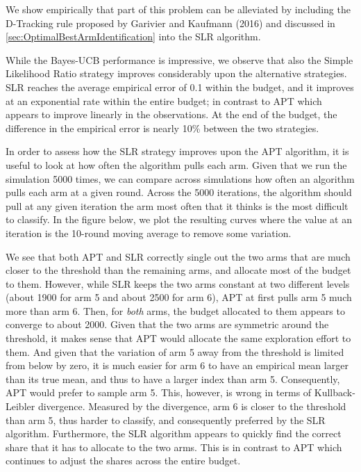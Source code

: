 \documentclass[11pt,]{article}
\begin{document}
We show empirically that part of this problem can be alleviated by
including the D-Tracking rule proposed by Garivier and Kaufmann (2016)
and discussed in \autoref{sec:OptimalBestArmIdentification} into the SLR
algorithm.

While the Bayes-UCB performance is impressive, we observe that also the
Simple Likelihood Ratio strategy improves considerably upon the
alternative strategies. SLR reaches the average empirical error of 0.1
within the budget, and it improves at an exponential rate within the
entire budget; in contrast to APT which appears to improve linearly in
the observations. At the end of the budget, the difference in the
empirical error is nearly 10\% between the two strategies.

In order to assess how the SLR strategy improves upon the APT algorithm,
it is useful to look at how often the algorithm pulls each arm. Given
that we run the simulation 5000 times, we can compare across simulations
how often an algorithm pulls each arm at a given round. Across the 5000
iterations, the algorithm should pull at any given iteration the arm
most often that it thinks is the most difficult to classify. In the
figure below, we plot the resulting curves where the value at an
iteration is the 10-round moving average to remove some variation.

We see that both APT and SLR correctly single out the two arms that are
much closer to the threshold than the remaining arms, and allocate most
of the budget to them. However, while SLR keeps the two arms constant at
two different levels (about 1900 for arm 5 and about 2500 for arm 6),
APT at first pulls arm 5 much more than arm 6. Then, for \emph{both}
arms, the budget allocated to them appears to converge to about 2000.
Given that the two arms are symmetric around the threshold, it makes
sense that APT would allocate the same exploration effort to them. And
given that the variation of arm 5 away from the threshold is limited
from below by zero, it is much easier for arm 6 to have an empirical
mean larger than its true mean, and thus to have a larger index than arm
5. Consequently, APT would prefer to sample arm 5. This, however, is
wrong in terms of Kullback-Leibler divergence. Measured by the
divergence, arm 6 is closer to the threshold than arm 5, thus harder to
classify, and consequently preferred by the SLR algorithm. Furthermore,
the SLR algorithm appears to quickly find the correct share that it has
to allocate to the two arms. This is in contrast to APT which continues
to adjust the shares across the entire budget.
\end{document}
